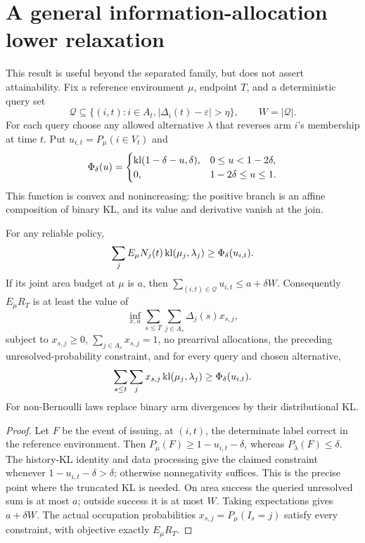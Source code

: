 \section{A general information-allocation lower relaxation}
\label{app:information}

This result is useful beyond the separated family, but does not assert
attainability. Fix a reference environment $\mu$, endpoint $T$, and a
deterministic query set
\[
 \mathcal Q\subseteq\{(i,t):i\in A_t,
                  |\Delta_i(t)-\varepsilon|>\eta\},\qquad W=|\mathcal Q|.
\]
For each query choose any allowed alternative $\lambda$ that reverses arm
$i$'s membership at time $t$. Put $u_{i,t}=P_\mu(i\in V_t)$ and
\[
 \Phi_\delta(u)=
 \begin{cases}
 \operatorname{kl}(1-\delta-u,\delta),&0\le u<1-2\delta,\\
 0,&1-2\delta\le u\le1.
 \end{cases}
\]
This function is convex and nonincreasing: the positive branch is an affine
composition of binary KL, and its value and derivative vanish at the join.

\begin{proposition}
\label{prop:information}
For any reliable policy,
\[
 \sum_jE_\mu N_j(t)\operatorname{kl}(\mu_j,\lambda_j)
                       \ge\Phi_\delta(u_{i,t}).
\]
If its joint area budget at $\mu$ is $a$, then
$\sum_{(i,t)\in\mathcal Q}u_{i,t}\le a+\delta W$. Consequently $E_\mu R_T$
is at least the value of
\[
 \inf_{x,u}\sum_{s\le T}\sum_{j\in A_s}\Delta_j(s)x_{s,j},
\]
subject to $x_{s,j}\ge0$, $\sum_{j\in A_s}x_{s,j}=1$, no prearrival
allocations, the preceding unresolved-probability constraint, and for every
query and chosen alternative,
\[
 \sum_{s\le t}\sum_jx_{s,j}\operatorname{kl}(\mu_j,\lambda_j)
                             \ge\Phi_\delta(u_{i,t}).
\]
For non-Bernoulli laws replace binary arm divergences by their distributional KL.
\end{proposition}
\begin{proof}
Let $F$ be the event of issuing, at $(i,t)$, the determinate label correct in
the reference environment. Then $P_\mu(F)\ge1-u_{i,t}-\delta$, whereas
$P_\lambda(F)\le\delta$. The history-KL identity and data processing give
the claimed constraint whenever $1-u_{i,t}-\delta>\delta$; otherwise
nonnegativity suffices. This is the precise point where the truncated KL is
needed. On area success the queried unresolved sum is at most $a$; outside
success it is at most $W$. Taking expectations gives $a+\delta W$.
The actual occupation probabilities $x_{s,j}=P_\mu(I_s=j)$ satisfy every
constraint, with objective exactly $E_\mu R_T$.
\end{proof}

